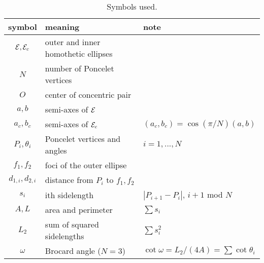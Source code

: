 \begin{table}[H]
\small
\begin{tabular}{|c|l|l|}
\hline
symbol & meaning & note \\
\hline
$\mathcal{E},\mathcal{E}_c$ & outer and inner homothetic ellipses & \\
$N$ & number of Poncelet vertices & \\
$O$ & center of concentric pair & \\
$a,b$ & semi-axes of $\mathcal{E}$ & \\
$a_c,b_c$ & semi-axes of $\mathcal{E}_c$ & $(a_c,b_c) = \cos(\pi/N) (a,b)$ \\
$P_i,\theta_i$ & Poncelet vertices and angles & $i=1,...,N$\\
$f_1,f_2$ & foci of the outer ellipse & \\
$d_{1,i},d_{2,i}$ & distance from $P_i$ to $f_1,f_2$ & \\
$s_i$ & ith sidelength & $|P_{i+1}-P_i|$, $i+1$ mod $N$\\
$A,L$ & area and perimeter & $\sum{s_i}$ \\
$L_{2}$ & sum of squared sidelengths & $\sum{s_i^2}$ \\
$\omega$ & Brocard angle ($N=3$) & $\cot\omega=L_{2}/(4A)=\sum\cot{\theta_i}$ \\
\hline
\end{tabular}
\caption{Symbols used.}
\label{tab:symbols}
\end{table}
